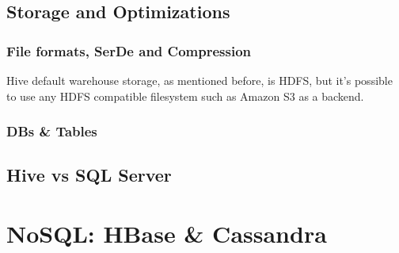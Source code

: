 \subsection{Storage and Optimizations}

\subsubsection{File formats, SerDe and Compression}
Hive default warehouse storage, as mentioned before, is HDFS, but it's possible to use any HDFS compatible filesystem such as Amazon S3 as a backend. 

\subsubsection{DBs \& Tables}


\subsection{Hive vs SQL Server}


\section{NoSQL: HBase \& Cassandra}

